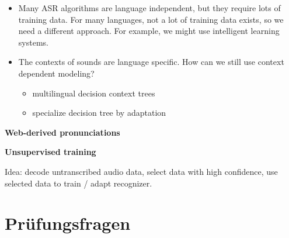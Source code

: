 \documentclass[11pt]{article}
\begin{document}
\begin{itemize}
    \item Many ASR algorithms are language independent, but they require lots of training data. For many languages, not a lot of training data exists, so we need a different approach. For example, we might use intelligent learning systems.
    \item The contexts of sounds are language specific. How can we still use context dependent modeling?
        \begin{itemize}
            \item multilingual decision context trees
            \item specialize decision tree by adaptation
        \end{itemize}
\end{itemize}

\vspace{10pt}
\textbf{Web-derived pronunciations}
\vspace{5pt}

\vspace{10pt}
\textbf{Unsupervised training}
\vspace{5pt}

Idea: decode untranscribed audio data, select data with high confidence, use selected data to train / adapt recognizer.

\newpage
\section{Prüfungsfragen}
\end{document}
